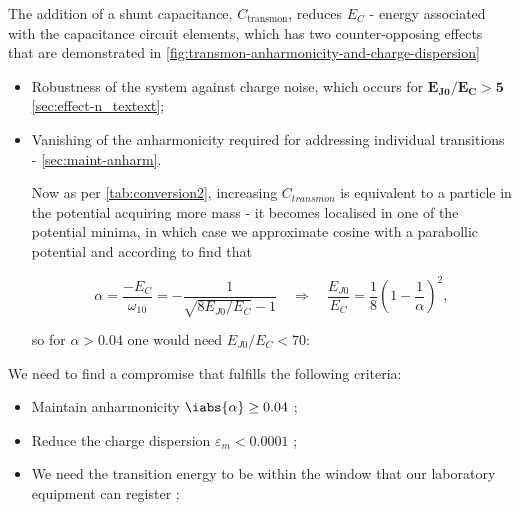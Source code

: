 The addition  of a shunt capacitance,  $C_{\text{transmon}}$, reduces
$E_{C}$ -  energy associated  with the capacitance  circuit elements,
which  has  two counter-opposing  effects  that  are demonstrated  in
\autoref{fig:transmon-anharmonicity-and-charge-dispersion}
\begin{itemize}
\item Robustness of the system against charge noise, which occurs for
  $\mathbf{E_{J0}/E_C>5}$ \hfill \autoref{sec:effect-n_textext};
\item  Vanishing   of  the  anharmonicity  required   for  addressing
  individual transitions - 
  \cite{Kjaergaard_2020} \hfill \autoref{sec:maint-anharm}.

  Now as per  \autoref{tab:conversion2}, increasing $C_{transmon}$ is
  equivalent to a particle in the  potential acquiring more mass - it
  becomes localised in one of the  potential minima, in which case we
  approximate  cosine with  a parabollic  potential and  according to
  \cite{Koch_2007} find that

\begin{equation}\label{eq:transmon-anharmonicity}
  \alpha = \frac{-E_{C}}{\omega_{10}} = -\frac{1}{\sqrt{8E_{J0}/E_C} - 1} \quad \Rightarrow \quad \frac{E_{J0}}{E_C} = \frac{1}{8}\left( 1 - \frac{1}{\alpha} \right)^2,
\end{equation}

\noindent so for $\alpha>0.04$ one would need $E_{J0}/E_C < 70$:
\end{itemize}

\begin{framed}\noindent
  \noindent We need to find  a compromise that fulfills the following
  criteria:

  \begin{itemize}
  \item  Maintain  anharmonicity  $\iabs{\alpha} \ge  0.04  $  \hfill
    ;
  \item Reduce the charge  dispersion $\varepsilon_m < 0.0001$ \hfill
    ;
  \item We  need the transition energy  to be within the  window that
    our     laboratory     equipment      can     register     \hfill
    ;
  \end{itemize}
\end{framed}

